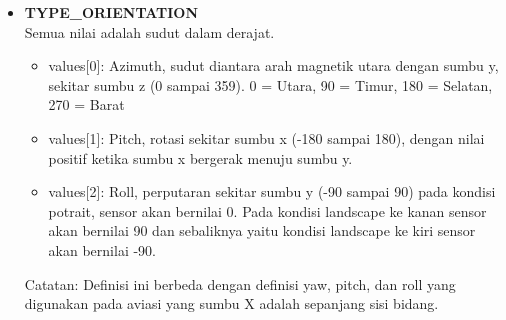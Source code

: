 \documentclass[a4paper,twoside]{article}
\begin{document}
\begin{enumerate}
\begin{itemize}
\item \textbf{TYPE\_ORIENTATION}\\
Semua nilai adalah sudut dalam derajat.
\begin{itemize}
	\item values[0]: Azimuth, sudut diantara arah magnetik utara dengan sumbu y, sekitar sumbu z (0 sampai 359). 0 = Utara, 90 = Timur, 180 = Selatan, 270 = Barat
	\item values[1]: Pitch, rotasi sekitar sumbu x (-180 sampai 180), dengan nilai positif ketika sumbu x bergerak menuju sumbu y.
	\item values[2]: Roll, perputaran sekitar sumbu y (-90 sampai 90) pada kondisi potrait, sensor akan bernilai 0. Pada kondisi landscape ke kanan sensor akan bernilai 90 dan sebaliknya yaitu kondisi landscape ke kiri sensor akan bernilai -90.
\end{itemize}

Catatan: Definisi ini berbeda dengan definisi yaw, pitch, dan roll yang digunakan pada aviasi yang sumbu X adalah sepanjang sisi bidang.


\end{itemize}
\end{enumerate}
\end{document}
